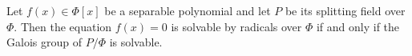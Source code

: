 Let $f(x) \in \Phi[x]$ be a separable polynomial and let $P$ be its splitting field over $\Phi$. Then the equation $f(x) = 0$ is solvable by radicals over $\Phi$ if and only if the Galois group of $P/\Phi$ is solvable.
